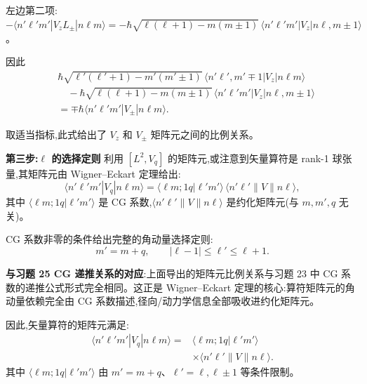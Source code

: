 \begin{question}
\begin{solution}
	左边第二项:$-\langle n'\ell'm'|V_z L_\pm|n\ell m\rangle
	= -\hbar\sqrt{\ell(\ell+1)-m(m\pm1)}\,\langle n'\ell'm'|V_z|n\ell,m\pm1\rangle$。

	因此
	\[
	\begin{aligned}
	&\hbar\sqrt{\ell'(\ell'+1)-m'(m'\pm1)}\,\langle n'\ell',m'\mp1|V_z|n\ell m\rangle\\
	&\quad-\hbar\sqrt{\ell(\ell+1)-m(m\pm1)}\,\langle n'\ell'm'|V_z|n\ell,m\pm1\rangle\\
	&=\mp\hbar\langle n'\ell'm'|V_\pm|n\ell m\rangle.
	\end{aligned}
	\]

	取适当指标,此式给出了 $V_z$ 和 $V_\pm$ 矩阵元之间的比例关系。

	\textbf{第三步:$\ell$ 的选择定则} 利用 $[L^2,V_q]$ 的矩阵元,或注意到矢量算符是 rank-1 球张量,其矩阵元由 Wigner--Eckart 定理给出:
	\[
	\langle n'\ell'm'|V_q|n\ell m\rangle = \langle \ell m;1q|\ell'm'\rangle\,\langle n'\ell'\|V\|n\ell\rangle,
	\]
	其中 $\langle \ell m;1q|\ell'm'\rangle$ 是 CG 系数,$\langle n'\ell'\|V\|n\ell\rangle$ 是约化矩阵元(与 $m,m',q$ 无关)。

	CG 系数非零的条件给出完整的角动量选择定则:
	\[
	m' = m+q,\qquad |\ell-1| \le \ell' \le \ell+1.
	\]

	\textbf{与习题 25 CG 递推关系的对应}:上面导出的矩阵元比例关系与习题 23 中 CG 系数的递推公式形式完全相同。这正是 Wigner--Eckart 定理的核心:算符矩阵元的角动量依赖完全由 CG 系数描述,径向/动力学信息全部吸收进约化矩阵元。

	因此,矢量算符的矩阵元满足:
	\[
	\boxed{\begin{aligned}\langle n'\ell'm'|V_q|n\ell m\rangle={}&\langle \ell m;1q|\ell'm'\rangle\\&\times\langle n'\ell'\|V\|n\ell\rangle.\end{aligned}}
	\]
	其中 $\langle \ell m;1q|\ell'm'\rangle$ 由 $m'=m+q$、$\ell'=\ell,\ell\pm1$ 等条件限制。
	\end{solution}
\end{question}

